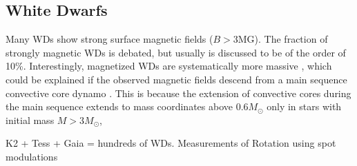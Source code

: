 {\color{red} \subsection{White Dwarfs}}
Many WDs show strong surface magnetic fields ($B>$3MG). The fraction of strongly magnetic WDs is debated, but usually is discussed to be of the order of 10\%. Interestingly, magnetized WDs are systematically more massive \cite{Ferrario_2015}, which could be explained if the observed magnetic fields descend from a main sequence convective core dynamo \cite{Cantiello_2016}. This is because the extension of convective cores during the main sequence extends to mass coordinates above 0.6$M_\odot$ only in stars with initial mass $M>3M_\odot$,  

K2 + Tess + Gaia = hundreds of WDs. Measurements of Rotation using spot modulations